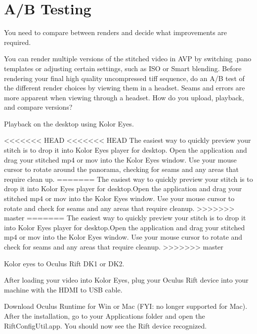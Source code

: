 \chapter{A/B Testing}
\pagecolor{white}
\label{chap:46}
\begin{fullwidth}

\problem

{\large You need to compare between renders and decide what improvements are required. \par}

You can render multiple versions of the stitched video in AVP by switching .pano templates or adjusting certain settings, such as ISO or Smart blending. Before rendering your final high quality uncompressed tiff sequence, do an A/B test of the different render choices by viewing them in a headset. Seams and errors are more apparent when viewing through a headset. How do you upload, playback, and compare versions?

\solutions

{\large Playback on the desktop using Kolor Eyes. \par}


<<<<<<< HEAD
<<<<<<< HEAD
The easiest way to quickly preview your stitch is to drop it into Kolor Eyes player for desktop. Open the application and drag your stitched mp4 or mov into the Kolor Eyes window. Use your mouse cursor to rotate around the panorama, checking for seams and any areas that require clean up.  
=======
The easiest way to quickly preview your stitch is to drop it into Kolor Eyes player for desktop.Open the application and drag your stitched mp4 or mov into the Kolor Eyes window. Use your mouse cursor to rotate and check for seams and any areas that require cleanup.
>>>>>>> master
=======
The easiest way to quickly preview your stitch is to drop it into Kolor Eyes player for desktop.Open the application and drag your stitched mp4 or mov into the Kolor Eyes window. Use your mouse cursor to rotate and check for seams and any areas that require cleanup.
>>>>>>> master

{\large Kolor eyes to Oculus Rift DK1 or DK2. \par}

After loading your video into Kolor Eyes, plug your Oculus Rift device into your machine with the HDMI to USB cable.

Download Oculus Runtime for Win or Mac (FYI: no longer supported for Mac). After the installation, go to your Applications folder and open the RiftConfigUtil.app. You should now see the Rift device recognized.


\end{fullwidth}
